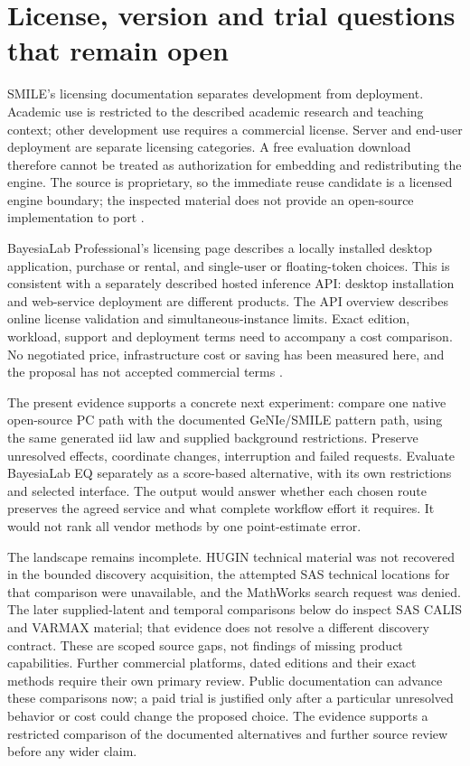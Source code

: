\section{License, version and trial questions that remain open}

SMILE's licensing documentation separates development from deployment.
Academic use is restricted to the described academic research and teaching
context; other development use requires a commercial license. Server and
end-user deployment are separate licensing categories. A free evaluation
download therefore cannot be treated as authorization for embedding and
redistributing the engine. The source is proprietary, so the immediate reuse
candidate is a licensed engine boundary; the inspected material does not
provide an open-source implementation to port
\citep{exec13_smile_license}.

BayesiaLab Professional's licensing page describes a locally installed desktop
application, purchase or rental, and single-user or floating-token choices.
This is consistent with a separately described hosted inference API: desktop
installation and web-service deployment are different products. The API
overview describes online license validation and simultaneous-instance limits.
Exact edition, workload, support and deployment terms need to accompany a
cost comparison. No negotiated price, infrastructure cost or saving has been
measured here, and the proposal has not accepted commercial terms
\citep{exec13_bayesia_professional,exec13_bayesia_api}.

The present evidence supports a concrete next experiment: compare one
native open-source PC path with the documented GeNIe/SMILE pattern path,
using the same generated iid law and supplied background restrictions.
Preserve unresolved effects, coordinate changes, interruption and failed
requests. Evaluate BayesiaLab EQ separately as a score-based alternative,
with its own restrictions and selected interface. The output would answer
whether each chosen route preserves the agreed service and what complete
workflow effort it requires. It would not rank all vendor methods by one
point-estimate error.

The landscape remains incomplete. HUGIN technical material was not recovered
in the bounded discovery acquisition, the attempted SAS technical locations
for that comparison were unavailable, and the MathWorks search request was
denied. The later supplied-latent and temporal comparisons below do inspect
SAS CALIS and VARMAX material; that evidence does not resolve a different
discovery contract. These are scoped source gaps, not findings of missing
product capabilities. Further commercial
platforms, dated editions and their exact methods require their own primary
review. Public documentation can advance these comparisons now; a paid
trial is justified only after a particular unresolved behavior or cost could
change the proposed choice. The evidence supports a restricted comparison
of the documented alternatives and further source review before any wider claim.
\label{exec13:commercial-end}
